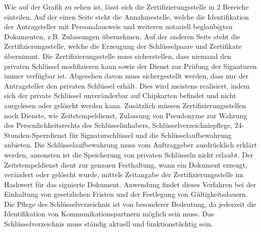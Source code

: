 Wie auf der Grafik zu sehen ist, lässt sich die Zertifizierungsstelle in 2 Bereiche einteilen. Auf der einen Seite steht die Annahmestelle, welche die Identifikation der Antragsteller mit Personalausweis und weiteren notariell beglaubigten Dokumenten, z.B. Zulassungen übernehmen. Auf der anderen Seite steht die Zertifizierungsstelle, welche die Erzeugung der Schlüsselpaare und Zertifikate übernimmt. Die Zertifizierungsstelle muss sicherstellen, dass niemand den privaten Schlüssel modifizieren kann sowie der Dienst zur Prüfung der Signaturen immer verfügbar ist. Abgesehen davon muss sichergestellt werden, dass nur der Antragsteller den privaten Schlüssel erhält. Dies wird meistens realisiert, indem sich der private Schlüssel unveränderbar auf Chipkarten befindet und nicht ausgelesen oder gelöscht werden kann. 
Zusätzlich müssen Zertifizierungsstellen noch Dienste, wie Zeitstempeldienst, Zulassung von Pseudonyme zur Wahrung des Personlichkeitsrechts des Schlüsselinhabers, Schlüsselverzeichnispflege, 24-Stunden-Sperrdienst für Signaturschlüssel und die Schlüsselaufbewahrung anbieten. Die Schlüsselaufbewahrung muss vom Auftraggeber ausdrücklich erklärt werden, ansonsten ist die Speicherung von privaten Schlüsseln nicht erlaubt. Der Zeitstempeldienst dient zur genauen Festhaltung, wann ein Dokument erzeugt, verändert oder gelöscht wurde, mittels Zeitangabe der Zertifizierungsstelle im Hashwert für das signierte Dokument. Anwendung findet dieses Verfahren bei der Einhaltung von gesetzlichen Fristen und der Festlegung von Gültigkeitsdauern. Die Pflege des Schlüsselverzeichnis ist von besonderer Bedeutung, da jederzeit die Identifikation von Kommunikationspartnern möglich sein muss. Das Schlüsselverzeichnis muss ständig aktuell und funktionstüchtig sein. \cite{standdeswissens3}\cite{zertstelle1}
